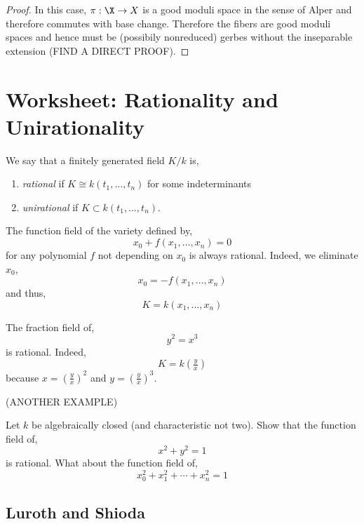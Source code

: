 \documentclass[12pt]{article}
\begin{document}
\begin{proof}
In this case, $\pi : \X \to X$ is a good moduli space in the sense of Alper and therefore commutes with base change. Therefore the fibers are good moduli spaces and hence must be (possibily nonreduced) gerbes without the inseparable extension (FIND A DIRECT PROOF).
\end{proof}

\section{Worksheet: Rationality and Unirationality}

\begin{defn}
We say that a finitely generated field $K / k$ is,
\begin{enumerate}
\item \textit{rational} if $K \cong k(t_1, \dots, t_n)$ for some indeterminants 

\item \textit{unirational} if $K \subset k(t_1, \dots, t_n)$.
\end{enumerate}
\end{defn}

\begin{example}
The function field of the variety defined by,
\[ x_0 + f(x_1, \dots, x_n) = 0 \]
for any polynomial $f$ not depending on $x_0$ is always rational. Indeed, we eliminate $x_0$,
\[ x_0 = - f(x_1, \dots, x_n) \]
and thus,
\[ K = k(x_1, \dots, x_n) \]
\end{example}

\begin{example}
The fraction field of,
\[ y^2 = x^3 \]
is rational. Indeed,
\[ K = k(\tfrac{y}{x}) \]
because $x = (\tfrac{y}{x})^2$ and $y = (\tfrac{y}{x})^3$. 
\end{example}

\begin{example}
(ANOTHER EXAMPLE)
\end{example}

\begin{exercise}
Let $k$ be algebraically closed (and characteristic not two). Show that the function field of,
\[ x^2 + y^2 = 1 \]
is rational. What about the function field of,
\[ x^2_0 + x_1^2 + \cdots + x_n^2 = 1 \]
\end{exercise}


\subsection{Luroth and Shioda}
\end{document}
